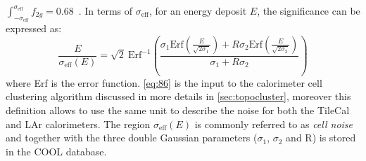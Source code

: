 $\int_{- \sigma_{\text{eff}}}^{\sigma_{\text{eff}}} f_{2g} =
0.68$~\cite{TileReadiness}.  In terms of $\sigma_{\text{eff}}$, for an energy
deposit $E$, the significance can be expressed as:
\begin{equation}
  \label{eq:86}
  \frac{E}{\sigma_{\text{eff}}(E)} = \sqrt{2}\ \text{Erf}^{- 1} \left( \frac{\sigma_1
      \text{Erf} \left(\frac{E}{\sqrt{2 \sigma_1}} \right) + R \sigma_2 \text{Erf}
    \left( \frac{E}{\sqrt{2 \sigma_2}} \right)}{\sigma_1 + R \sigma_2} \right)
\end{equation}
where Erf is the error function. \cref{eq:86} is the input to the calorimeter
cell clustering algorithm discussed in more details in \cref{sec:topocluster},
moreover this definition allows to use the same unit to describe the noise for
both the TileCal and LAr calorimeters. The region $\sigma_{\text{eff}}(E)$ is
commonly referred to as \emph{cell noise} and together with the three double
Gaussian parameters ($\sigma_1$, $\sigma_2$ and R) is stored in the COOL
database.
